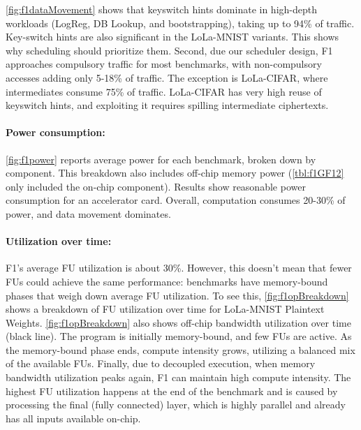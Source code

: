 \autoref{fig:f1dataMovement} shows that keyswitch hints dominate in high-depth workloads
(LogReg, DB Lookup, and bootstrapping), taking up to 94\% of traffic.
Key-switch hints are also significant in the LoLa-MNIST variants.
This shows why scheduling should prioritize them.
Second, due our scheduler design, F1 approaches compulsory
traffic for most benchmarks, with non\hyp{}compulsory accesses
adding only 5-18\% of traffic.
The exception is LoLa-CIFAR, where intermediates consume 75\% of traffic.
LoLa-CIFAR has very high reuse of keyswitch hints,
and exploiting it requires spilling intermediate ciphertexts.

\figFOneDataMovement
\figFOneOpBreakdown

\paragraph{Power consumption:}
\autoref{fig:f1power} reports average power for each benchmark, broken down by component.
This breakdown also includes off-chip memory power (\autoref{tbl:f1GF12} only included the on-chip component).
Results show reasonable power consumption for an accelerator card.
Overall, computation consumes 20-30\% of power, and data movement dominates.

\paragraph{Utilization over time:}
F1's average FU utilization is about 30\%.
However, this doesn't mean that fewer FUs could achieve the same performance:
benchmarks have memory\hyp{}bound phases 
that weigh down average FU utilization.
To see this, \autoref{fig:f1opBreakdown} shows a breakdown of FU utilization over 
time for LoLa-MNIST Plaintext Weights.
\autoref{fig:f1opBreakdown} also shows off-chip bandwidth utilization over time (black line).
The program is initially memory-bound, and few FUs are active.
As the memory-bound phase ends, compute intensity grows, 
utilizing a balanced mix of the available FUs.
Finally, due to decoupled execution,
when memory bandwidth utilization peaks again,
F1 can maintain high compute intensity.
The highest FU utilization happens at the end of the benchmark and is caused by processing
the final (fully connected) layer, which is highly parallel and already has all inputs available on-chip.


